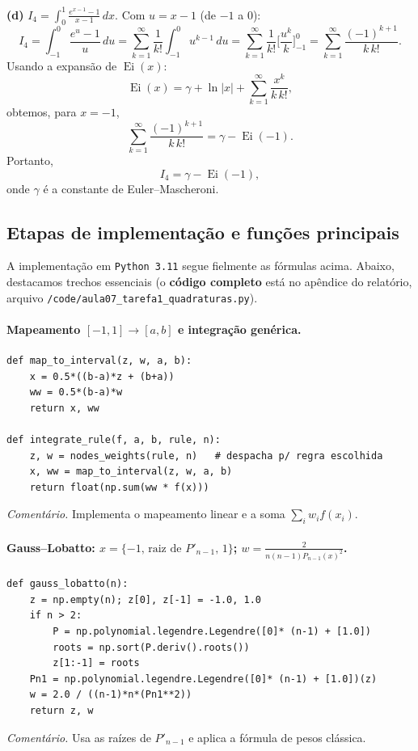 \documentclass[12pt,a4paper]{article}
\begin{document}
\vspace{1cm}

\textbf{(d) } $I_4=\displaystyle\int_{0}^{1}\frac{e^{x-1}-1}{x-1}\,dx$. Com $u=x-1$ (de $-1$ a $0$):
\[
I_4=\int_{-1}^{0}\frac{e^{u}-1}{u}\,du
=\sum_{k=1}^{\infty}\frac{1}{k!}\int_{-1}^{0}u^{k-1}\,du
=\sum_{k=1}^{\infty}\frac{1}{k!}\Big[\frac{u^{k}}{k}\Big]_{-1}^{0}
=\sum_{k=1}^{\infty}\frac{(-1)^{k+1}}{k\,k!}.
\]
Usando a expansão de $\operatorname{Ei}(x)$:
\[
\operatorname{Ei}(x)=\gamma+\ln|x|+\sum_{k=1}^{\infty}\frac{x^{k}}{k\,k!},
\]
obtemos, para $x=-1$,
\[
\sum_{k=1}^{\infty}\frac{(-1)^{k+1}}{k\,k!}=\gamma-\operatorname{Ei}(-1).
\]
Portanto,
\[
I_4=\gamma-\operatorname{Ei}(-1),
\]
onde $\gamma$ é a constante de Euler–Mascheroni.

\subsection{Etapas de implementação e funções principais}
A implementação em \texttt{Python 3.11} segue fielmente as fórmulas acima. Abaixo, destacamos trechos essenciais (o \textbf{código completo} está no apêndice do relatório, arquivo \texttt{/code/aula07\_tarefa1\_quadraturas.py}).

\paragraph{Mapeamento $[-1,1]\to[a,b]$ e integração genérica.}
\begin{verbatim}
def map_to_interval(z, w, a, b):
    x = 0.5*((b-a)*z + (b+a))
    ww = 0.5*(b-a)*w
    return x, ww

def integrate_rule(f, a, b, rule, n):
    z, w = nodes_weights(rule, n)   # despacha p/ regra escolhida
    x, ww = map_to_interval(z, w, a, b)
    return float(np.sum(ww * f(x)))
\end{verbatim}
\emph{Comentário.} Implementa o mapeamento linear e a soma $\sum_i w_i f(x_i)$.

\paragraph{Gauss–Lobatto: $x=\{-1,\,\text{raiz de }P'_{n-1},\,1\}$; $w=\tfrac{2}{n(n-1)P_{n-1}(x)^2}$.}
\begin{verbatim}
def gauss_lobatto(n):
    z = np.empty(n); z[0], z[-1] = -1.0, 1.0
    if n > 2:
        P = np.polynomial.legendre.Legendre([0]* (n-1) + [1.0])
        roots = np.sort(P.deriv().roots())
        z[1:-1] = roots
    Pn1 = np.polynomial.legendre.Legendre([0]* (n-1) + [1.0])(z)
    w = 2.0 / ((n-1)*n*(Pn1**2))
    return z, w
\end{verbatim}
\emph{Comentário.} Usa as raízes de $P'_{n-1}$ e aplica a fórmula de pesos clássica.
\end{document}
